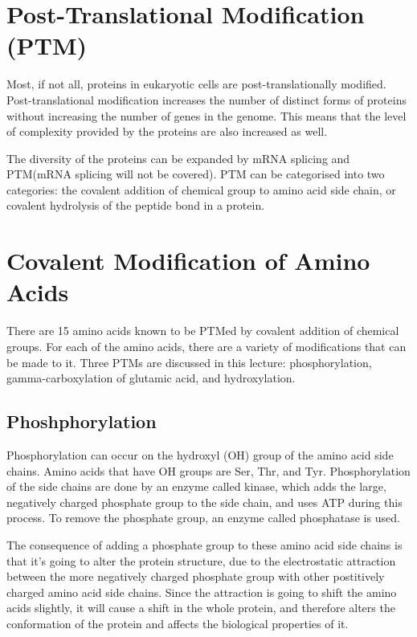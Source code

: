 \section{Post-Translational Modification (PTM)}

Most, if not all,  proteins in eukaryotic cells are post-translationally modified.
Post-translational modification increases the number of distinct forms of proteins without increasing the number of genes in the genome.
This means that the level of complexity provided by the proteins are also increased as well.

The diversity of the proteins can be expanded by mRNA splicing and PTM\@ (mRNA splicing will not be covered).
PTM can be categorised into two categories: the covalent addition of chemical group to amino acid side chain, or covalent hydrolysis of the peptide bond in a protein.

\section{Covalent Modification of Amino Acids}

There are 15 amino acids known to be PTMed by covalent addition of chemical groups.
For each of the amino acids, there are a variety of modifications that can be made to it.
Three PTMs are discussed in this lecture: phosphorylation, gamma-carboxylation of glutamic acid, and hydroxylation.

\subsection{Phoshphorylation}

Phosphorylation can occur on the hydroxyl (OH) group of the amino acid side chains.
Amino acids that have OH groups are Ser, Thr, and Tyr.
Phosphorylation of the side chains are done by an enzyme called kinase, which adds the large, negatively charged phosphate group to the side chain, and uses ATP during this process.
To remove the phosphate group, an enzyme called phosphatase is used.

The consequence of adding a phosphate group to these amino acid side chains is that it's going to alter the protein structure, due to the electrostatic attraction between the more negatively charged phosphate group with other postitively charged amino acid side chains.
Since the attraction is going to shift the amino acids slightly, it will cause a shift in the whole protein, and therefore alters the conformation of the protein and affects the biological properties of it.

